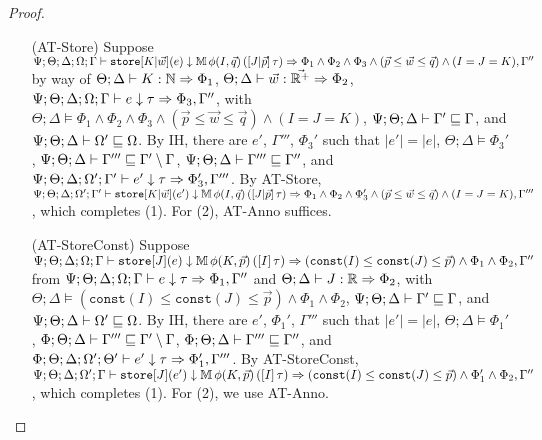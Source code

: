 \begin{proof}
\begin{itemize}
  \item[(AT-Store)] Suppose
  $\Psi ; \Theta ; \Delta ; \Omega ; \Gamma \vdash \texttt{store}[K|\vec{w}](e) \downarrow \mathbb{M} \, \phi(I,\vec{q}) \, ([J | \vec{p}] \, \tau) \Rightarrow \Phi_1 \wedge \Phi_2 \wedge\Phi_3 \wedge  (\vec{p} \leq \vec{w} \leq \vec{q}) \wedge (I = J = K), \Gamma''$ by way of
  $\Theta ; \Delta \vdash K : \mathbb{N} \Rightarrow \Phi_1$,
  $\Theta ; \Delta \vdash \vec{w} : \vec{\mathbb{R}^+} \Rightarrow \Phi_2$,
  $\Psi ; \Theta ; \Delta ; \Omega ; \Gamma \vdash e \downarrow \tau \Rightarrow \Phi_3,\Gamma''$, with
  $\Theta ; \Delta \vDash \Phi_1 \wedge \Phi_2 \wedge\Phi_3 \wedge  (\vec{p} \leq \vec{w} \leq \vec{q}) \wedge (I = J = K)$,
  $\Psi ; \Theta ; \Delta \vdash \Gamma' \sqsubseteq \Gamma$, and
  $\Psi ; \Theta ; \Delta \vdash \Omega' \sqsubseteq \Omega$.
  By IH, there are $e'$, $\Gamma'''$, $\Phi_3'$ such that
  $|e'| = |e|$,
  $\Theta ; \Delta \vDash \Phi_3'$,
  $\Psi ; \Theta ; \Delta \vdash \Gamma''' \sqsubseteq \Gamma' \setminus \Gamma$,
  $\Psi ; \Theta ; \Delta \vdash \Gamma''' \sqsubseteq \Gamma''$, and
  $\Psi ; \Theta ; \Delta ; \Omega' ; \Gamma' \vdash e' \downarrow \tau \Rightarrow \Phi_3', \Gamma'''$.
  By AT-Store,
  $\Psi ; \Theta ; \Delta ; \Omega' ; \Gamma' \vdash \texttt{store}[K|\vec{w}](e') \downarrow \mathbb{M} \, \phi(I,\vec{q}) \, ([J | \vec{p}] \, \tau) \Rightarrow \Phi_1 \wedge \Phi_2 \wedge\Phi_3' \wedge  (\vec{p} \leq \vec{w} \leq \vec{q}) \wedge (I = J = K), \Gamma'''$,
  which completes (1). For (2), AT-Anno suffices.
  
  \item[(AT-StoreConst)] Suppose $\Psi ; \Theta ; \Delta ; \Omega ; \Gamma \vdash \texttt{store}[J](e) \downarrow \mathbb{M} \, \phi(K,\vec{p}) \, ([I] \, \tau) \Rightarrow (\texttt{const}(I) \leq \texttt{const}(J) \leq \vec{p}) \wedge \Phi_1 \wedge \Phi_2, \Gamma''$ from
  $\Psi ; \Theta ; \Delta ; \Omega ; \Gamma \vdash e \downarrow \tau \Rightarrow \Phi_1,\Gamma''$ and
  $\Theta ; \Delta \vdash J : \mathbb{R} \Rightarrow \Phi_2$, with
  $\Theta ; \Delta \vDash (\texttt{const}(I) \leq \texttt{const}(J) \leq \vec{p}) \wedge \Phi_1 \wedge \Phi_2$,
  $\Psi ; \Theta ; \Delta \vdash \Gamma' \sqsubseteq \Gamma$, and
  $\Psi ; \Theta ; \Delta \vdash \Omega' \sqsubseteq \Omega$.
  By IH, there are $e'$, $\Phi_1'$, $\Gamma'''$ such that
  $|e'| = |e|$,
  $\Theta ; \Delta \vDash \Phi_1'$,
  $\Phi ; \Theta ; \Delta \vdash \Gamma''' \sqsubseteq \Gamma' \setminus \Gamma$,
  $\Phi ; \Theta ; \Delta \vdash \Gamma''' \sqsubseteq \Gamma''$, and
  $\Phi ; \Theta ; \Delta ; \Omega' ; \Theta' \vdash e' \downarrow \tau \Rightarrow \Phi_1', \Gamma'''$.
  By AT-StoreConst,
  $\Psi ; \Theta ; \Delta ; \Omega' ; \Gamma \vdash \texttt{store}[J](e') \downarrow \mathbb{M} \, \phi(K,\vec{p}) \, ([I] \, \tau) \Rightarrow (\texttt{const}(I) \leq \texttt{const}(J) \leq \vec{p}) \wedge \Phi_1' \wedge \Phi_2, \Gamma''$, which completes (1). For (2), we use AT-Anno.
  

\end{itemize}
\end{proof}
